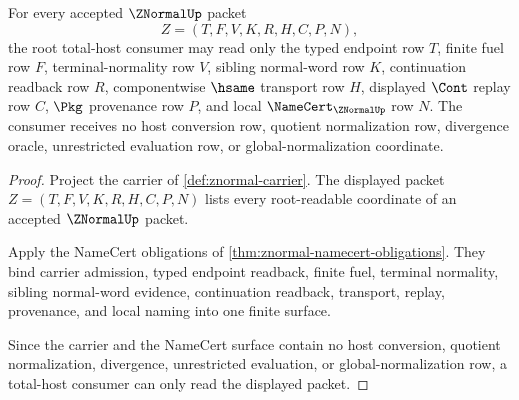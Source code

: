 \begin{theorem}
\label{thm:znormal-root-total-host-readiness}
For every accepted $\ZNormalUp$ packet
$$
Z=(T,F,V,K,R,H,C,P,N),
$$
the root total-host consumer may read only the typed endpoint row $T$, finite fuel row $F$, terminal-normality row $V$, sibling normal-word row $K$, continuation readback row $R$, componentwise $\hsame$ transport row $H$, displayed $\Cont$ replay row $C$, $\Pkg$ provenance row $P$, and local $\NameCert_{\ZNormalUp}$ row $N$. The consumer receives no host conversion row, quotient normalization row, divergence oracle, unrestricted evaluation row, or global-normalization coordinate.
\end{theorem}
\begin{proof}
Project the carrier of \autoref{def:znormal-carrier}. The displayed packet $Z=(T,F,V,K,R,H,C,P,N)$ lists every root-readable coordinate of an accepted $\ZNormalUp$ packet.

Apply the NameCert obligations of \autoref{thm:znormal-namecert-obligations}. They bind carrier admission, typed endpoint readback, finite fuel, terminal normality, sibling normal-word evidence, continuation readback, transport, replay, provenance, and local naming into one finite surface.

Since the carrier and the NameCert surface contain no host conversion, quotient normalization, divergence, unrestricted evaluation, or global-normalization row, a total-host consumer can only read the displayed packet.
\end{proof}

